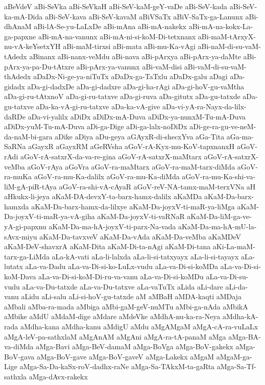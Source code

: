 {aBeVdeV
aBi-SeVka
aBi-SeVkaH
aBi-SeV-kaM-geY-vaDe
aBi-SeV-kada
aBi-SeV-ka-mA-Dida
aBi-SeV-kava
aBi-SeV-kavaM
aBiVSaTx
aBiV-SaTx-ga-Lanunx
aBi-dhAnaM
aBi-lA-Se-yu-LaLxDe
aBi-mAna
aBi-mA-nakekx
aBi-mA-na-kokx-La-ga-papxne
aBi-mA-na-vanunx
aBi-mA-ni-si-koM-Di-tetxnanx
aBi-maM-tArxyX-nu-vA-keYsetxYH
aBi-maM-tirxsi
aBi-mata
aBi-mu-Ka-vAgi
aBi-naM-di-su-vaM-tAdedx
aBinanx
aBi-nanx-veMdu
aBi-nava
aBi-pArxya
aBi-pArx-ya-daMte
aBi-pArx-ya-pa-Du-tAtxre
aBi-pArx-ya-vanunx
aBi-vaM-disi
aBi-vaM-di-su-vaM-thAdedx
aDaDx-Ni-ge-ya-niTuTx
aDaDx-ga-TaTxlu
aDaDx-galu
aDagi
aDa-gidadx
aDa-gi-dadxDe
aDa-gi-dadxre
aDa-gi-ha-rAgi
aDa-gi-hoV-gu-vaMtha
aDa-gi-ru-tAtxnoV
aDa-gi-ru-tatxve
aDa-gi-ruva
aDa-gitutx
aDa-gu-tatxde
aDa-gu-tatxve
aDa-ka-vA-gi-ru-tatxve
aDa-ka-vA-give
aDa-vi-yA-ra-Nayx-da-lilx-daRDe
aDa-vi-yalilx
aDiDx
aDiDx-mA-Duva
aDiDx-ya-nunxM-Tu-mA-Duva
aDiDx-yuM-Tu-mA-Duva
aDi-ga-Dige
aDi-ga-lalx-noDiDx
aDi-ge-ra-gu-ve-neM-da-naM-bi-gara
aDike
aDiya
aDu-geya
aGAyxR-di-shecxYva
aGa-Tita
aGa-ma-SaRNa
aGayxR
aGayxRM
aGeRVsha
aGoV-rA-Kyx-mu-KoV-tapxnanxH
aGoV-rAdi
aGoV-rA-satxrX-da-va-re-gina
aGoV-rA-satxrX-maMtarx
aGoV-rA-satxrX-veMba
aGoV-rAya
aGoVra
aGoV-ra-maMtarx
aGoV-ra-maM-tarx-diMda
aGoV-ra-muKa
aGoV-ra-mu-Ka-dalilx
aGoV-ra-mu-Ka-diMda
aGoV-ra-mu-Ka-shi-va-liM-gA-piR-tAya
aGoV-ra-shi-vA-cAyaR
aGoV-reV-NA-tamx-maM-terxVNa
aH
aHkukx-li-jeya
aKaM-DA-devxY-ta-barx-hamx-dalilx
aKaMDa
aKaM-Da-barx-hamxda
aKaM-Da-barx-hamx-da-lilxye
aKaM-Da-joyxV-ti-maR-ya-liMga
aKaM-Da-joyxV-ti-maR-ya-vA-giha
aKaM-Da-joyxV-ti-vaRNaR
aKaM-Da-liM-ga-ve-yA-gi-papxnu
aKaM-Da-ma-hA-joyxV-ti-parx-Na-vada
aKaM-Da-ma-hA-mU-la-sAvx-miyu
aKaM-Da-tavxveV
aKaM-Da-vAda
aKaM-Da-veMba
aKaMDeV
aKaM-DeV-shavxrA
aKaM-Dita
aKaM-Di-ta-nAgi
aKaM-Di-tana
aKi-La-maM-tarx-ga-LiMda
aLa-kA-vati
aLa-li-lalxda
aLa-li-si-tatxyayx
aLa-li-si-tayayx
aLa-lutatx
aLa-va-Dadu
aLa-va-Di-si-ko-LuLx-vudu
aLa-va-Di-si-koMDa
aLa-va-Di-si-koM-Dava
aLa-va-Di-si-koM-Di-ru-va-vanu
aLa-va-Di-si-koMDu
aLa-va-Di-su-vudu
aLa-va-Du-tatxde
aLa-va-Du-tatxve
aLa-vaTuTx
aLida
aLi-dare
aLi-da-vanu
aLidu
aLi-salu
aLi-si-hoV-gu-tatxde
aM
aMBaH
aMDA-kaqti
aMDaja
aMbali
aMba-ra-mada
aMbiga
aMbi-gaM-geV-nuMTu
aMbi-ga-nAda
aMbikA
aMbike
aMdU
aMdaM-dige
aMdare
aMdeVke
aMdhA-nu-ka-ra-Neya
aMdha-kA-rada
aMdha-kana
aMdha-kanu
aMdigU
aMdu
aMgAMgaM
aMgA-cA-ra-vuLaLx
aMgA-leV-pa-sathxlaM
aMgAnAM
aMgAni
aMgA-ra-tA-panaM
aMga
aMga-BA-va-diMda
aMga-Bavi
aMga-BeV-damaM
aMga-BoVga
aMga-BoV-gakekx
aMga-BoV-gava
aMga-BoV-gave
aMga-BoV-gaveV
aMga-Lakekx
aMgaM
aMgaM-ga-Lige
aMga-Sa-Da-kaSx-roV-dadhx-raNe
aMga-Sa-TAkxM-ta-gaRta
aMga-Sa-Tf-sathxla
aMga-dAvx-rakekx
}
